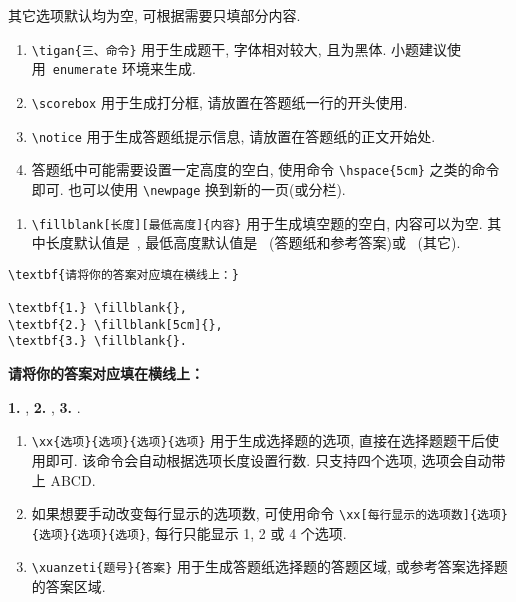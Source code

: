 \documentclass{hfutexam}
\begin{document}
其它选项默认均为空, 可根据需要只填部分内容.
\newpage

\begin{enumerate}
\item \lstinline|\tigan{三、命令}| 用于生成题干, 字体相对较大, 且为黑体. 小题建议使用~{\color{blue}\lstinline|enumerate|} 环境来生成.
\item \hspace{-8mm}\scorebox\hspace{8mm}\lstinline|\scorebox| 用于生成打分框, 请放置在答题纸一行的开头使用.
\vspace{-2mm}
\item \lstinline|\notice| 用于生成答题纸提示信息, 请放置在答题纸的正文开始处.
\item 答题纸中可能需要设置一定高度的空白, 使用命令 \lstinline|\hspace{5cm}| 之类的命令即可. 也可以使用 \lstinline|\newpage| 换到新的一页(或分栏).
\end{enumerate}

\begin{enumerate}[resume]
\item \lstinline|\fillblank[长度][最低高度]{内容}| 用于生成填空题的空白, 内容可以为空. 其中长度默认值是~{\color{blue}{\lstinline|3.5cm|}}, 最低高度默认值是~{\color{blue}{\lstinline|1cm|}} (答题纸和参考答案)或~{\color{blue}{\lstinline|0.5cm|}} (其它).
\end{enumerate}

\textit{\color{blue}{填空题示例:}}
\begin{lstlisting}
\textbf{请将你的答案对应填在横线上：}

\textbf{1.} \fillblank{}, 
\textbf{2.} \fillblank[5cm]{}, 
\textbf{3.} \fillblank{}.
\end{lstlisting}

\begin{tcolorbox}
\textbf{请将你的答案对应填在横线上：}

\textbf{1.} \fillblank[3.5cm][1cm]{}, 
\textbf{2.} \fillblank[5cm][1cm]{}, 
\textbf{3.} \fillblank[3.5cm][1cm]{}.
\end{tcolorbox}

\begin{enumerate}[resume]
\item \lstinline|\xx{选项}{选项}{选项}{选项}| 用于生成选择题的选项, 直接在选择题题干后使用即可. 该命令会自动根据选项长度设置行数. 只支持四个选项, 选项会自动带上 ABCD.
\item 如果想要手动改变每行显示的选项数, 可使用命令 \lstinline|\xx[每行显示的选项数]{选项}{选项}{选项}{选项}|, 每行只能显示 1, 2 或 4 个选项.
\item \lstinline|\xuanzeti{题号}{答案}| 用于生成答题纸选择题的答题区域, 或参考答案选择题的答案区域.
\end{enumerate}
\end{document}
